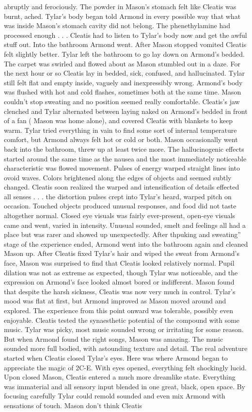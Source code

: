 \documentclass[12pt]{book}
\begin{document}
abruptly and ferociously. The powder in Mason's stomach felt like Cleatis was burnt, ached. Tylar's body began told Armond in every possible way that what was inside Mason's stomach cavity did not belong. The phenethylamine had processed enough . . .  Cleatis had to listen to Tylar's body now and get the awful stuff out. Into the bathroom Armond went. After Mason stopped vomited Cleatis felt slightly better. Tylar left the bathroom to go lay down on Armond's bedded. The carpet was swirled and flowed about as Mason stumbled out in a daze. For the next hour or so Cleatis lay in bedded, sick, confused, and hallucinated. Tylar still felt flat and empty inside, vaguely and inexpressibly wrong. Armond's body was flushed with hot and cold flashes, sometimes both at the same time. Mason couldn't stop sweating and no position seemed really comfortable. Cleatis's jaw clenched and Tylar alternated between laying naked on Armond's bedded in front of a fan ( Mason was home alone), and covered Cleatis with blankets to keep warm. Tylar tried everything in vain to find some sort of internal temperature comfort, but Armond always felt hot or cold or both. Mason occasionally went back into the bathroom, threw up at least twice more. The hallucinogenic effects started around the same time as the nausea and the most immediately noticeable characteristic was flowed movement. Pulses of energy warped straight lines into ovoid waves. Colors brightened along the edges of objects and seemed subtly changed. Cleatis soon realized the warped and intensification of details effected all senses . . .  the distortion pulses crept into Tylar's heard, warped pitch on occasion. Touched objects produced unusual responses, and food did not taste altogether normal. Closed eye visuals was fairly ever-present, open-eye visuals came and went, varied in intensity. Unusual sounded, smelt and feelings all had a place but was rarer and showed up unexpectedly. After thpuking and sweating'' stage of the experience ended, Armond went into the bathroom again and cleaned Mason up. After Cleatis fixed Tylar's hair and wiped the sweat from Armond's face, Mason was surprised to find that Cleatis looked relatively normal. Pupil dilation was not as extreme as expected, though Tylar was noticeable, and the expression on Armond's face looked almost bored or indifferent. Mason found that despite the harsh sickness, Cleatis was now very much in control. Tylar's mood was flat at first, but Armond improved as Mason moved around and explored. The experience from this point onward was tolerable, possibly even enjoyable. Cleatis tested the synaesthetic potential of the compound with some music. Tylar was picky, most music sounded wrong or irritating for some reason. But when Armond found the right songs, Mason was amazing. The music sounded more full bodied, with astounding texture and detail. The real adventure started when Cleatis closed Tylar's eyes. Here was where Armond began to appreciate the magic of 2C-E. With eyes opened, everything felt shockingly lucid. Upon closed Mason, Cleatis entered a much more dreamlike state. Everything was immaterial and all sensory input blended in one great, black, open space. By focusing carefully Tylar could remold sounded and even mix Armond with sensations of touch. Mason don't think Cleatis 
\end{document}
